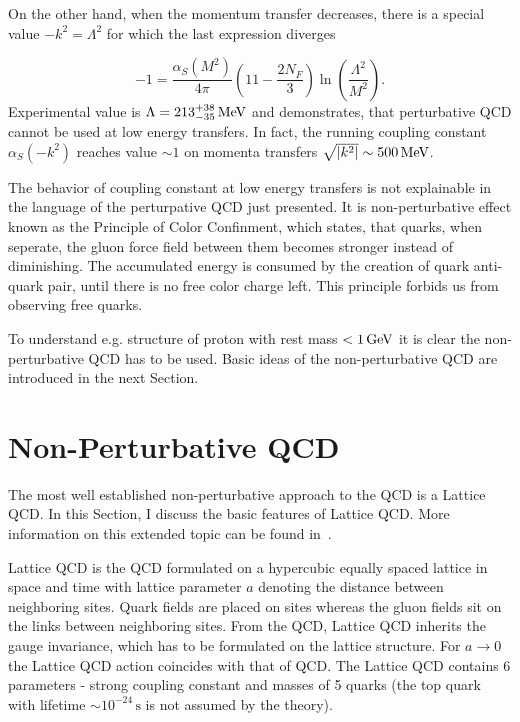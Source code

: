 On the other hand, when the momentum transfer decreases, there is a special value
$-k^2=\Lambda^2$ for which the last expression diverges

\begin{equation}
  -1 = \frac{\alpha_S(M^2)}{4\pi} \left( 11 - \frac{2N_F}{3} \right)
  \ln \left( \frac{\Lambda^2}{M^2} \right).
  \label{eq:RunningLambda}
\end{equation}
Experimental value is $\Lambda=213^{+38}_{-35}\,\text{MeV}$ \cite{wiki:QCDHistory} and demonstrates, that
perturbative QCD cannot be used at low energy transfers. In fact, the running
coupling constant $\alpha_S(-k^2)$ reaches value $\sim 1$ on momenta
transfers $\sqrt{\left| k^2 \right|} \sim 500\,\text{MeV}$. 

The behavior of coupling constant at low energy transfers is not explainable in
the language of the perturpative QCD just presented. It is non-perturbative effect
known as the Principle of Color Confinment, which states, that quarks, when
seperate, the gluon force field between them becomes stronger instead of
diminishing. The accumulated energy is consumed by the creation of quark
anti-quark pair, until there is no free color charge left. This principle
forbids us from observing free quarks.

To understand e.g. structure of proton with rest mass $< 1\,\text{GeV}$ it is clear the 
non-perturbative QCD has to be used. Basic ideas of the non-perturbative QCD are
introduced in the next Section. 

\section{Non-Perturbative QCD}

The most well established non-perturbative approach to the QCD is a Lattice QCD.
In this Section, I discuss the basic features of Lattice QCD. More
information on this extended topic can be found in~\cite{QCDTextbook,LQCDIntro}.

Lattice QCD is the QCD formulated on a hypercubic equally spaced lattice in
space and time with lattice parameter $a$ denoting the distance between
neighboring sites.
Quark fields are placed on sites whereas the gluon fields sit on the links
between neighboring sites. From the QCD, Lattice QCD inherits the gauge
invariance, which has to be formulated on the lattice structure.
For $a \rightarrow 0$ the Lattice QCD action coincides with that of QCD. 
The Lattice QCD contains 6 parameters - strong coupling constant and masses of 5
quarks (the top quark with lifetime $ \sim 10^{-24}\,\text{s}$ is not assumed by
the theory).

